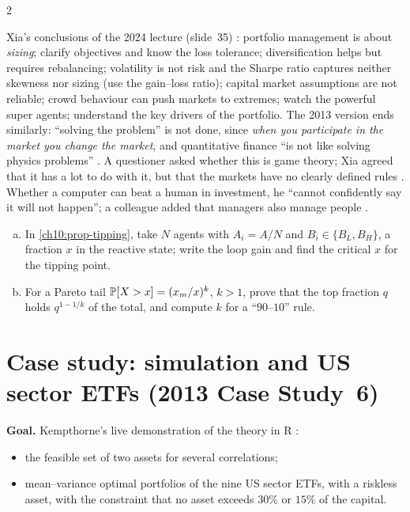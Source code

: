 \begin{paracol}{2}
\begin{finance}
Xia's conclusions of the 2024 lecture (slide~35) : portfolio management is about \emph{sizing}; clarify
objectives and know the loss tolerance; diversification helps but requires rebalancing; volatility is not risk and the
Sharpe ratio captures neither skewness nor sizing (use the gain--loss ratio); capital market assumptions are
not reliable; crowd behaviour can push markets to extremes; watch the powerful super agents; understand the key drivers of the
portfolio. The 2013 version ends similarly: ``solving the problem'' is not done, since \emph{when you participate
in the market you change the market}, and quantitative finance ``is not like solving physics problems''
. A questioner asked whether this is game theory; Xia agreed that it has
a lot to do with it, but that the markets have no clearly defined rules . Whether a
computer can beat a human in investment, he ``cannot confidently say it will not happen''; a colleague added that
managers also manage people .
\end{finance}

\begin{exercise}
\leavevmode
\begin{enumerate}[(a)]
  \item In \cref{ch10:prop-tipping}, take $N$ agents with $A_i=A/N$ and $B_i\in\{B_L,B_H\}$, a fraction $x$ in the reactive state; write the loop
      gain and find the critical $x$ for the tipping point.
  \item For a Pareto tail $\mathbb{P}[X>x]=(x_m/x)^k$, $k>1$, prove that the top fraction $q$
      holds $q^{1-1/k}$ of the total, and compute $k$ for a ``$90$--$10$'' rule.
\end{enumerate}
\end{exercise}


\section{Case study: simulation and US sector ETFs (2013 Case Study~6)}\label{ch10:sec-case}

\begin{casestudy}
\textbf{Goal.} Kempthorne's live demonstration of the theory in R :
\begin{itemize}
  \item the feasible set of two
      assets for several correlations;
  \item mean--variance optimal portfolios of the nine US sector ETFs, with a riskless
      asset, with the constraint that no asset exceeds $30\%$ or $15\%$ of the capital.
\end{itemize}


\end{casestudy}
\end{paracol}
